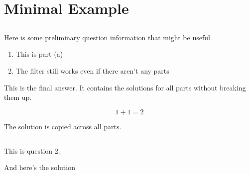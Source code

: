 \documentclass[12pt]{article}
\begin{document}
\section{Minimal Example}

\subsection{}

Here is some preliminary question information that might be useful.

\begin{enumerate}
    \item This is part (a)
    \item The filter still works even if there aren't any parts
\end{enumerate}

\begin{solution}

    This is the final answer. It contains the solutions for all parts without breaking them up.

    $$
        1+1 = 2
    $$

    The solution is copied across all parts.

\end{solution}

\subsection{}

This is question 2.

\begin{solution}
    And here's the solution
\end{solution}
\end{document}
